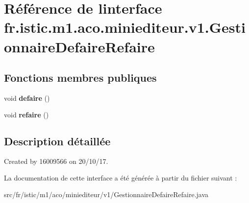 \hypertarget{interfacefr_1_1istic_1_1m1_1_1aco_1_1miniediteur_1_1v1_1_1GestionnaireDefaireRefaire}{}\section{Référence de l\textquotesingle{}interface fr.\+istic.\+m1.\+aco.\+miniediteur.\+v1.\+Gestionnaire\+Defaire\+Refaire}
\label{interfacefr_1_1istic_1_1m1_1_1aco_1_1miniediteur_1_1v1_1_1GestionnaireDefaireRefaire}
\subsection*{Fonctions membres publiques}
\begin{DoxyCompactItemize}
\item 
\mbox{\label{interfacefr_1_1istic_1_1m1_1_1aco_1_1miniediteur_1_1v1_1_1GestionnaireDefaireRefaire_a357dd5721e9569ee2493e3bb58ba560d}} 
void {\bfseries defaire} ()
\item 
\mbox{\label{interfacefr_1_1istic_1_1m1_1_1aco_1_1miniediteur_1_1v1_1_1GestionnaireDefaireRefaire_a4caf33a12b146b861ac7809c8f87a4a8}} 
void {\bfseries refaire} ()
\end{DoxyCompactItemize}


\subsection{Description détaillée}
Created by 16009566 on 20/10/17. 

La documentation de cette interface a été générée à partir du fichier suivant \+:\begin{DoxyCompactItemize}
\item 
src/fr/istic/m1/aco/miniediteur/v1/Gestionnaire\+Defaire\+Refaire.\+java\end{DoxyCompactItemize}
